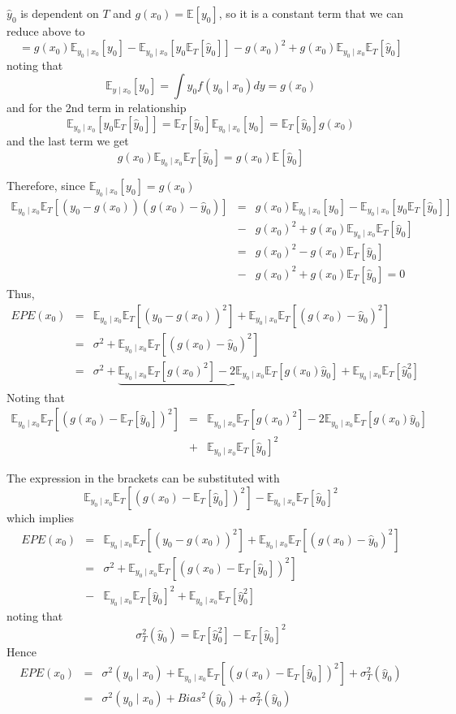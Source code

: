 \documentclass{beamer}
\newcommand{\E}{\mathbb{E}}
\begin{document}
\begin{frame}
$\hat{y}_0$ is dependent on $T$ and $g(x_0)=\E[y_0]$, so it is a constant term that we can reduce above to
\[
=g(x_0)\E_{y_0\mid x_0}[y_0]-\E_{y_0\mid x_0}[y_0\E_T[\hat{y}_0]]-g(x_0)^2+g(x_0)\E_{y_0\mid x_0}\E_T[\hat{y}_0]
\]
noting that
\[
\E_{y\mid x_0}[y_0]=\int y_0 f(y_0\mid x_0)dy=g(x_0)
\]
and for the 2nd term in relationship
\[
\E_{y_0\mid x_0}[y_0\E_T[\hat{y}_0]]=\E_T[\hat{y}_0]\E_{y_0\mid x_0}[y_0]=\E_T[\hat{y}_0]g(x_0)
\]
and the last term we get
\[
g(x_0)\E_{y_0\mid x_0}\E_T[\hat{y}_0]=g(x_0)\E[\hat{y}_0]
\]
\end{frame}
\begin{frame}
Therefore, since $\E_{y_0\mid x_0}[y_0]=g(x_0)$
\begin{eqnarray*}
\E_{y_0\mid x_0}\E_T[(y_0-g(x_0))(g(x_0)-\hat{y}_0)]&=&g(x_0)\E_{y_0\mid x_0}[y_0]-\E_{y_0\mid x_0}[y_0\E_T[\hat{y}_0]]\\
&-&g(x_0)^2+g(x_0)\E_{y_0\mid x_0}\E_T[\hat{y}_0]\\
&=&g(x_0)^2-g(x_0)\E_{T}[\hat{y}_0]\\
&-&g(x_0)^2+g(x_0)\E_T[\hat{y}_0]=0
\end{eqnarray*}
Thus,
\begin{eqnarray*}
EPE(x_0)&=&\E_{y_0\mid x_0}\E_T[(y_0-g(x_0))^2]+\E_{y_0\mid x_0}\E_T[(g(x_0)-\hat{y}_0)^2]\\
&=&\sigma^2+\E_{y_0\mid x_0}\E_T[(g(x_0)-\hat{y}_0)^2]\\
&=&\sigma^2+\underbrace{\E_{y_0\mid x_0}\E_T[g(x_0)^2]-2\E_{y_0\mid x_0}\E_T[g(x_0)\hat{y}_0]}+\E_{y_0\mid x_0}\E_T[\hat{y}_0^2]
\end{eqnarray*}
Noting that
\begin{eqnarray*}
\E_{y_0\mid x_0}\E_T[(g(x_0)-\E_T[\hat{y}_0])^2]&=&\E_{y_0\mid x_0}\E_T[g(x_0)^2]-2\E_{y_0\mid x_0}\E_T[g(x_0)\hat{y}_0]\\
&+&\E_{y_0\mid x_0}\E_T[\hat{y}_0]^2
\end{eqnarray*}
\end{frame}
\begin{frame}
The expression in the brackets can be substituted with
\[
 \E_{y_0\mid x_0}\E_T[(g(x_0)-\E_T[\hat{y}_0])^2]-\E_{y_0\mid x_0}\E_T[\hat{y}_0]^2
\]
which implies
\begin{eqnarray*}
EPE(x_0)&=&\E_{y_0\mid x_0}\E_T[(y_0-g(x_0))^2]+\E_{y_0\mid x_0}\E_T[(g(x_0)-\hat{y}_0)^2]\\
&=&\sigma^2+\E_{y_0\mid x_0}\E_T[(g(x_0)-\E_T[\hat{y}_0])^2]\\
&-&\E_{y_0\mid x_0}\E_T[\hat{y}_0]^2+\E_{y_0\mid x_0}\E_T[\hat{y}_0^2]
\end{eqnarray*}
noting that
\[
\sigma^2_T(\hat{y}_0)=\E_T[\hat{y}_0^2]-\E_T[\hat{y}_0]^2
\]
Hence
\begin{eqnarray*}
EPE(x_0)&=&\sigma^2(y_0\mid x_0)+\E_{y_0\mid x_0}\E_T[(g(x_0)-\E_T[\hat{y}_0])^2]+\sigma_T^2(\hat{y}_0)\\
&=&\sigma^2(y_0\mid x_0)+Bias^2(\hat{y}_0)+\sigma_T^2(\hat{y}_0)
\end{eqnarray*}
\end{frame}
\end{document}
